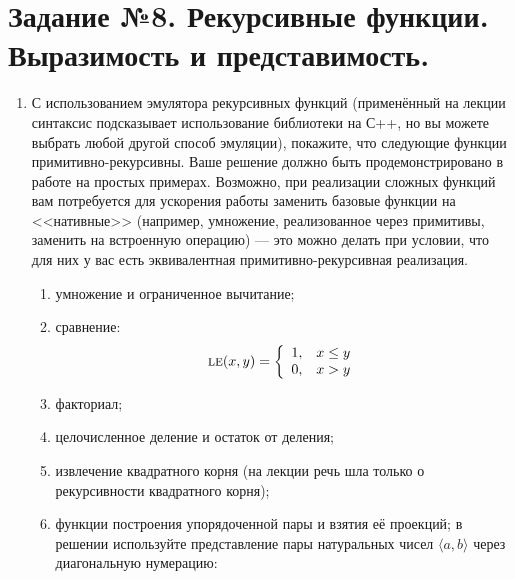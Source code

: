 \documentclass[10pt,a4paper,oneside]{article}
\begin{document}
\section*{Задание №8. Рекурсивные функции. Выразимость и представимость.}
\begin{enumerate}
\item С использованием эмулятора рекурсивных функций (применённый на лекции синтаксис
подсказывает использование библиотеки на С++, но вы можете выбрать любой другой способ эмуляции),
покажите, что следующие функции примитивно-рекурсивны. Ваше решение должно быть продемонстрировано
в работе на простых примерах. Возможно, при реализации сложных функций вам потребуется 
для ускорения работы заменить базовые функции на <<нативные>> (например, умножение, реализованное
через примитивы, заменить на встроенную операцию) --- это можно делать при условии, что для них у вас есть 
эквивалентная примитивно-рекурсивная реализация.
\begin{enumerate}
\item умножение и ограниченное вычитание;
\item сравнение: $$\textsc{le}(x,y)=\left\{\begin{array}{ll}1,&x \le y\\0,&x > y\end{array}\right.$$
\item факториал;
\item целочисленное деление и остаток от деления;
\item извлечение квадратного корня (на лекции речь шла только о рекурсивности квадратного корня);
\item функции построения упорядоченной пары и взятия её проекций; в решении используйте представление пары натуральных
чисел $\langle a,b\rangle$ через диагональную нумерацию:


\end{enumerate}
\end{enumerate}
\end{document}

